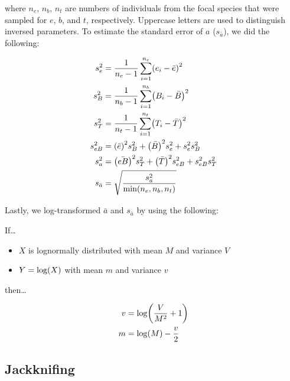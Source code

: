 \documentclass[12pt,]{article}
\providecommand{\tightlist}{%
  \setlength{\itemsep}{0pt}\setlength{\parskip}{0pt}}
\let\originalleft\left
\let\originalright\right
\renewcommand{\left}{\mathopen{}\mathclose\bgroup\originalleft}
\renewcommand{\right}{\aftergroup\egroup\originalright}
\begin{document}
where \(n_e\), \(n_b\), \(n_t\) are numbers of individuals from the focal species
that were sampled for \(e\), \(b\), and \(t\), respectively.
Uppercase letters are used to distinguish inversed parameters.
To estimate the standard error of \(a\) (\(s_{\bar{a}}\)), we did the following:

\begin{equation}
\label{eq:absorption4}
\begin{split}
    s_e^2 &= \frac{1}{n_e-1} \sum_{i=1}^{n_e}\left( e_{i} - \bar{e} \right)^2 \\
    s_B^2 &= \frac{1}{n_b-1} \sum_{i=1}^{n_b}\left( B_{i} - \bar{B} \right)^2 \\
    s_T^2 &= \frac{1}{n_t-1} \sum_{i=1}^{n_t}\left( T_{i} - \bar{T} \right)^2 \\
    s_{eB}^2 &= \left(\bar{e}\right)^2 s_B^2 + \left(\bar{B}\right)^2 s_e^2 + 
        s_e^2 s_B^2 \\
    s_{a}^2 &= \left(\bar{eB}\right)^2 s_T^2 + \left(\bar{T}\right)^2 s_{eB}^2 + 
        s_{eB}^2 s_T^2 \\
    s_{\bar{a}} &= \sqrt{\frac{ s_{a}^2 }{ \min\left( n_e, n_b, n_t \right) }}
\end{split}
\end{equation}

Lastly, we log-transformed \(\bar{a}\) and \(s_{\bar{a}}\) by using the following:

If\ldots

\begin{itemize}
\tightlist
\item
  \(X\) is lognormally distributed with mean \(M\) and variance \(V\)
\item
  \(Y = \log\left(X\right)\) with mean \(m\) and variance \(v\)
\end{itemize}

then\ldots

\begin{equation}
\label{eq:absorption-log}
\begin{split}
    v &= \log\left(\frac{V}{M^2} + 1 \right) \\
    m &= \log\left(M \right) - \frac{v}{2}
\end{split}
\end{equation}

\hypertarget{jackknifing}{%
\subsection{Jackknifing}\label{jackknifing}}
\end{document}
